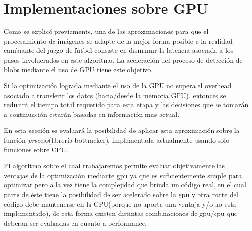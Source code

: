 \documentclass[a4paper,10pt]{report}
\begin{document}
\section{Implementaciones sobre GPU}


Como se explicó previamente, una de las aproximaciones para que el procesamiento de imágenes se adapte de la mejor forma posible a la realidad cambiante
del juego de fútbol consiste en disminuir la latencia asociada a los pasos involucrados en este algoritmo.
La aceleración del proceso de detección de blobs mediante el uso de GPU tiene este objetivo. 

Si la optimización lograda mediante el uso de la GPU no supera el overhead asociado a transferir los datos (hacia/desde
la memoria GPU), entonces se reducirá el tiempo total requerido para esta etapa y las decisiones que se tomarán a continuación estarán basadas en información mas actual.


En esta sección se evaluará la posibilidad de aplicar esta aproximación sobre la función \textit{process}(librería bottracker), implementada actualmente usando solo funciones sobre CPU.







El algoritmo sobre el cual trabajaremos permite evaluar objetivamente las ventajas de la optimización mediante gpu ya que es suficientemente simple para optimizar pero a la vez tiene la complejidad que brinda un 
código real, en el cual parte de éste tiene la posibilidad de ser acelerado sobre la gpu y otra parte del código debe mantenerse en la CPU(porque no aporta una ventaja y/o no esta implementado),
de esta forma existen distintas combinaciones de gpu/cpu que deberan ser evaluadas en cuanto a performance.
\end{document}
